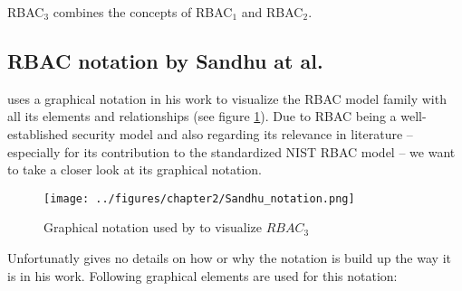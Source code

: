 \documentclass[twoside, openright, 12pt]{book}
\begin{document}
RBAC$_3$ combines the concepts of RBAC$_1$ and RBAC$_2$.





\subsection{RBAC notation by Sandhu at al.}
\label{RBAC_notation}
\cite{Sandhu96} uses a graphical notation in his work to visualize the RBAC model family with all its elements and relationships (see figure \ref{fig:Sandhu_notation}).
Due to RBAC being a well-established security model and also regarding its relevance in literature -- especially for its contribution to the standardized NIST RBAC model \citep{RBACNIST} -- we want to take a closer look at its graphical notation.

\begin{figure}[htb]
	\centering
	\texttt{[image: ../figures/chapter2/Sandhu\_notation.png]}
	\caption{Graphical notation used by \cite{Sandhu96} to visualize $RBAC_3$}
	\label{fig:Sandhu_notation}
\end{figure}

\noindent
Unfortunatly \cite{Sandhu96} gives no details on how or why the notation is build up the way it is in his work.
Following graphical elements are used for this notation:
\end{document}
